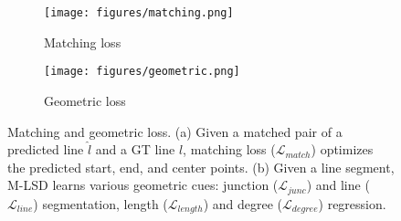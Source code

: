 \documentclass[letterpaper]{article} \usepackage{aaai22}  \usepackage{times}  \usepackage{helvet}  \usepackage{courier}  \usepackage[hyphens]{url}  \usepackage{graphicx} \urlstyle{rm} \def\UrlFont{\rm}  \usepackage{natbib}  \usepackage{caption} \DeclareCaptionStyle{ruled}{labelfont=normalfont,labelsep=colon,strut=off} \frenchspacing  \setlength{\pdfpagewidth}{8.5in}  \setlength{\pdfpageheight}{11in}  \usepackage{algorithm}
\begin{document}
\begin{comment}
For a loss function to train the center map, the weighted binary cross-entropy (WBCE) loss is used in \cite{huang2020tp}.
However, we observe that the number of positive (foreground) pixels is much less than that of negative (background) pixels, and such foreground-background class imbalance degrades the performance of the WBCE loss.
This is because the majority of pixels are easy negatives that contribute no useful learning signals.
Thus, we separate positive and negative terms of the binary cross-entropy loss to have the same scale, and reformulate a separated binary classification loss as follows:
\begin{eqnarray}
\label{eq:c_separate}
\resizebox{.7\hsize}{!}{$\ell_{pos}(F)=\frac{-1}{\sum_{p}I(p)}\sum_{p}W(p)\cdot log\sigma(F(p))$}, \\
\resizebox{.9\hsize}{!}{$\ell_{neg}(F)=\frac{-1}{\sum_{p}1-I(p)}\sum_{p}(1-I(p))\cdot log(1 - \sigma(F(p)))$}, \\
\ell_{cls}(F) =\lambda_{pos}\cdot \ell_{pos}(F) + \lambda_{neg}\cdot \ell_{neg}(F),
\label{eq:c_loss}
\end{eqnarray}
where $I(p)$ outputs 1 if the pixel $p$ of the GT map is non-zero, otherwise 0, $\sigma$ denotes a sigmoid function, and $W(p)$ and $F(p)$ are pixel values of the GT and feature map, respectively.
We use the center loss as $\mathcal{L}_{center}=\ell_{cls}(C)$, where $C$ denotes center map and set the weights ($\lambda_{pos}$, $\lambda_{neg}$) as (1,30).
For the displacement loss $\mathcal{L}_{disp}$, we use smooth L1 loss for regression learning as~\cite{huang2020tp}.
\end{comment}
\begin{comment}
\begin{eqnarray}
\mathcal L_{disp} =\frac{1}{\sum_{p}I(p)}\sum_{p}I(p)\cdot L_1^{smooth}(D(p), \hat{D}(p)),
\label{eq:d_loss}
\end{eqnarray}
where $D(p)$ is a pixel value in the displacement map.
\end{comment}

\begin{figure}[t!]
    \centering
    \begin{subfigure}[b]{0.48\columnwidth}
        \centering\texttt{[image: figures/matching.png]}
         \caption{Matching loss}
         \label{fig:matching}
     \end{subfigure}
     \begin{subfigure}[b]{0.48\columnwidth}
        \centering\texttt{[image: figures/geometric.png]}
         \caption{Geometric loss}
         \label{fig:geometric}
     \end{subfigure}
\caption{Matching and geometric loss. (a) Given a matched pair of a predicted line $\hat l$ and a GT line $l$, matching loss ($\mathcal L_{match}$) optimizes the predicted start, end, and center points. (b) Given a line segment, M-LSD learns various geometric cues: junction ($\mathcal L_{junc}$) and line ($\mathcal L_{line}$) segmentation, length ($\mathcal L_{length}$) and degree ($\mathcal L_{degree}$) regression.}
\label{fig:losses}
\end{figure}
\end{document}
